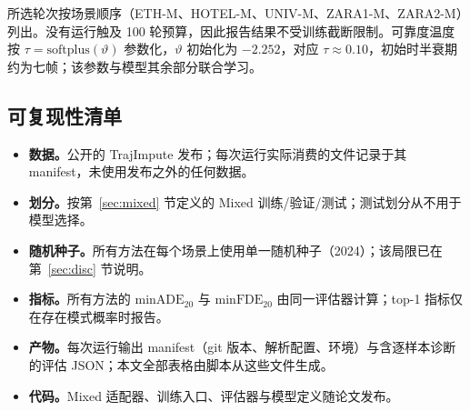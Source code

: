 所选轮次按场景顺序（ETH-M、HOTEL-M、UNIV-M、ZARA1-M、ZARA2-M）列出。没有运行触及 100 轮预算，因此报告结果不受训练截断限制。可靠度温度按 $\tau=\mathrm{softplus}(\vartheta)$ 参数化，$\vartheta$ 初始化为 $-2.252$，对应 $\tau\approx0.10$，初始时半衰期约为七帧；该参数与模型其余部分联合学习。

\subsection{可复现性清单}
\label{app:checklist}

\begin{itemize}
\item \textbf{数据。}公开的 TrajImpute 发布；每次运行实际消费的文件记录于其 manifest，未使用发布之外的任何数据。
\item \textbf{划分。}按第~\ref{sec:mixed} 节定义的 Mixed 训练/验证/测试；测试划分从不用于模型选择。
\item \textbf{随机种子。}所有方法在每个场景上使用单一随机种子（2024）；该局限已在第~\ref{sec:disc} 节说明。
\item \textbf{指标。}所有方法的 $\mathrm{minADE}_{20}$ 与 $\mathrm{minFDE}_{20}$ 由同一评估器计算；top-1 指标仅在存在模式概率时报告。
\item \textbf{产物。}每次运行输出 manifest（git 版本、解析配置、环境）与含逐样本诊断的评估 JSON；本文全部表格由脚本从这些文件生成。
\item \textbf{代码。}Mixed 适配器、训练入口、评估器与模型定义随论文发布。
\end{itemize}

